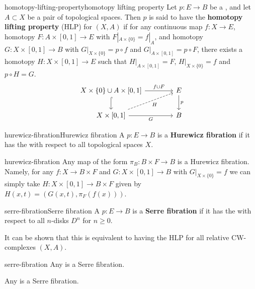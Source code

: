 \begin{topic}{homotopy-lifting-property}{homotopy lifting property}
    Let $p : E \to B$ be a , and let $A \subset X$ be a pair of topological spaces. Then $p$ is said to have the \textbf{homotopy lifting property} (HLP) for $(X, A)$ if for any continuous map $f : X \to E$, homotopy $F : A \times [0, 1] \to E$ with $F|_{A \times \{ 0 \}} = f|_A$, and homotopy $G : X \times [0, 1] \to B$ with $G|_{X \times \{ 0 \}} = p \circ f$ and $G|_{A \times [0, 1]} = p \circ F$, there exists a homotopy $H : X \times [0, 1] \to E$ such that $H|_{A \times [0, 1]} = F$, $H|_{X \times \{ 0 \}} = f$ and $p \circ H = G$.
    \[ \begin{tikzcd}[column sep=4em]
        X \times \{ 0 \} \cup A \times [0, 1] \arrow[hookrightarrow]{d} \arrow{r}{f \cup F} & E \arrow{d}{p} \\ X \times [0, 1] \arrow[swap]{r}{G} \arrow[swap, dashed]{ur}{H} & B
    \end{tikzcd} \]
\end{topic}

\begin{topic}{hurewicz-fibration}{Hurewicz fibration}
    A  $p : E \to B$ is a \textbf{Hurewicz fibration} if it has the  with respect to all topological spaces $X$.
\end{topic}

\begin{example}{hurewicz-fibration}
    Any map of the form $\pi_B : B \times F \to B$ is a Hurewicz fibration. Namely, for any $f : X \to B \times F$ and $G : X \times [0, 1] \to B$ with $G|_{X \times \{ 0 \}} = f$ we can simply take $H : X \times [0, 1] \to B \times F$ given by $H(x, t) = (G(x, t), \pi_F(f(x)))$.
\end{example}

\begin{topic}{serre-fibration}{Serre fibration}
    A  $p : E \to B$ is a \textbf{Serre fibration} if it has the  with respect to all $n$-disks $D^n$ for $n \ge 0$.
    
    It can be shown that this is equivalent to having the HLP for all relative CW-complexes $(X, A)$.
\end{topic}

\begin{example}{serre-fibration}
    Any  is a Serre fibration.
    
    Any  is a Serre fibration.
\end{example}

